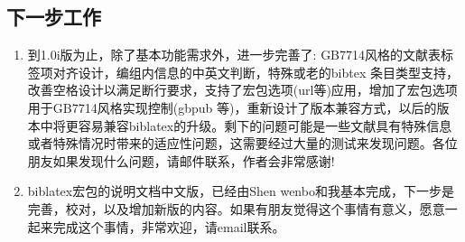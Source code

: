 \subsection{下一步工作}

\begin{enumerate}
  \item 到1.0i版为止，除了基本功能需求外，进一步完善了: GB7714风格的文献表标签项对齐设计，编组内信息的中英文判断，特殊或老的bibtex 条目类型支持，改善空格设计以满足断行要求，支持了宏包选项(url等)应用，增加了宏包选项用于GB7714风格实现控制(gbpub 等)，重新设计了版本兼容方式，以后的版本中将更容易兼容biblatex的升级。剩下的问题可能是一些文献具有特殊信息或者特殊情况时带来的适应性问题，这需要经过大量的测试来发现问题。各位朋友如果发现什么问题，请邮件联系，作者会非常感谢!





  \item biblatex宏包的说明文档中文版，已经由Shen wenbo和我基本完成，下一步是完善，校对，以及增加新版的内容。如果有朋友觉得这个事情有意义，愿意一起来完成这个事情，非常欢迎，请email联系。


\end{enumerate}

